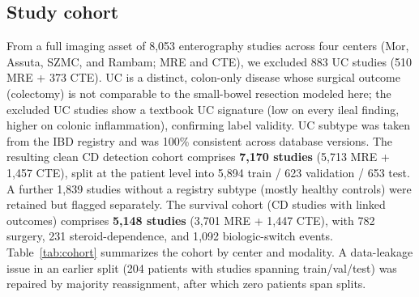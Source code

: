 \documentclass[11pt]{article}
\begin{document}
\subsection*{Study cohort}

From a full imaging asset of 8{,}053 enterography studies across four centers (Mor, Assuta, SZMC,
and Rambam; MRE and CTE), we excluded 883 UC studies (510 MRE + 373 CTE). UC is a distinct,
colon-only disease whose surgical outcome (colectomy) is not comparable to the small-bowel
resection modeled here; the excluded UC studies show a textbook UC signature (low on every
ileal finding, higher on colonic inflammation), confirming label validity. UC subtype was taken
from the IBD registry and was 100\% consistent across database versions. The resulting clean CD
detection cohort comprises \textbf{7{,}170 studies} (5{,}713 MRE + 1{,}457 CTE), split at the patient
level into 5{,}894 train / 623 validation / 653 test. A further 1{,}839 studies without a registry
subtype (mostly healthy controls) were retained but flagged separately. The survival cohort (CD
studies with linked outcomes) comprises \textbf{5{,}148 studies} (3{,}701 MRE + 1{,}447 CTE), with
782 surgery, 231 steroid-dependence, and 1{,}092 biologic-switch events. Table~\ref{tab:cohort}
summarizes the cohort by center and modality. A data-leakage issue in an earlier split (204
patients with studies spanning train/val/test) was repaired by majority reassignment, after which
zero patients span splits.
\end{document}
